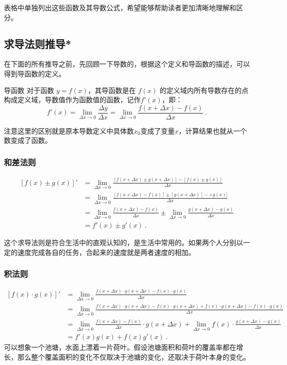 表格中单独列出这些函数及其导数公式，希望能够帮助读者更加清晰地理解和区分。


\subsection{求导法则推导*}

在下面的所有推导之前，先回顾一下导数的，根据这个定义和导函数的描述，可以得到导函数的定义。
\begin{definition}{导函数}\label{def_HsDerB_1}
对于函数 $y=f(x)$，其导函数是在 $f(x)$ 的定义域内所有导数存在的点构成定义域，导数值作为函数值的函数，记作$f'(x)$，即：
\begin{equation}
f'(x)=\lim_{\Delta x\to 0}\frac{\Delta y}{\Delta x}=\lim_{\Delta x\to0}\frac{f(x+\Delta x)-f(x)}{\Delta x}~.
\end{equation}
\end{definition}

注意这里的区别就是原本导数定义中具体数$x_0$变成了变量$x$，计算结果也就从一个数变成了函数。


\subsubsection{和差法则}

\begin{equation}
\begin{split}
\left[f(x)\pm g(x)\right]'&=\lim_{\Delta x\to 0}\frac{[f(x+\Delta x)\pm g(x+\Delta x)]-[f(x)\pm g(x)]}{\Delta x}\\
&=\lim_{\Delta x\to 0}\frac{[f(x+\Delta x)-f(x)]\pm [g(x+\Delta x)]-+g(x)]}{\Delta x}\\
&=\lim_{\Delta x\to 0}\frac{f(x+\Delta x)-f(x)}{\Delta x}\pm\lim_{\Delta x\to 0}\frac{g(x+\Delta x)-g(x)}{\Delta x}\\
&=f'(x)\pm g'(x)~.
\end{split}
\end{equation}


这个求导法则是符合生活中的直观认知的，是生活中常用的。如果两个人分别以一定的速度完成各自的任务，合起来的速度就是两者速度的相加。

\subsubsection{积法则}
\begin{equation}
\begin{split}
\left[f(x)\cdot g(x)\right]'&=\lim_{\Delta x\to 0}\frac{f(x+\Delta x)\cdot g(x+\Delta x)-f(x)\cdot g(x)}{\Delta x}\\
&=\lim_{\Delta x\to 0}\frac{f(x+\Delta x)\cdot g(x+\Delta x)-f(x)\cdot g(x+\Delta x)+f(x)\cdot g(x+\Delta x)-f(x)\cdot g(x)}{\Delta x}\\
&=\lim_{\Delta x\to 0}\frac{f(x+\Delta x)-f(x)}{\Delta x}\cdot g(x+\Delta x)+\lim_{\Delta x\to 0}f(x)\cdot\frac{g(x+\Delta x)-g(x)}{\Delta x}\\
&=f'(x)g(x)+f(x) g'(x)~.
\end{split}
\end{equation}
可以想象一个池塘，水面上漂着一片荷叶。假设池塘面积和荷叶的覆盖率都在增长，那么整个覆盖面积的变化不仅取决于池塘的变化，还取决于荷叶本身的变化。


